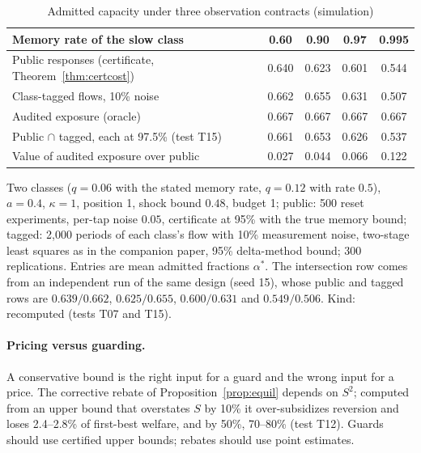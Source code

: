 \documentclass[12pt]{article}
\theoremstyle{definition}
\theoremstyle{remark}
\begin{document}
\begin{table}[t]\centering\small
\begin{threeparttable}
\caption{Admitted capacity under three observation contracts (simulation)}\label{tab:discsim}
\begin{tabular}{lcccc}
\toprule
Memory rate of the slow class & 0.60 & 0.90 & 0.97 & 0.995\\
\midrule
Public responses (certificate, Theorem~\ref{thm:certcost}) & 0.640 & 0.623 & 0.601 & 0.544\\
Class-tagged flows, 10\% noise & 0.662 & 0.655 & 0.631 & 0.507\\
Audited exposure (oracle) & 0.667 & 0.667 & 0.667 & 0.667\\
Public $\cap$ tagged, each at 97.5\% (test T15) & 0.661 & 0.653 & 0.626 & 0.537\\
\midrule
Value of audited exposure over public & 0.027 & 0.044 & 0.066 & 0.122\\
\bottomrule
\end{tabular}
\begin{tablenotes}\footnotesize\item Two classes ($q=0.06$ with the stated memory rate, $q=0.12$ with rate $0.5$), $a=0.4$, $\kappa=1$, position 1, shock bound $0.48$, budget 1; public: 500 reset experiments, per-tap noise $0.05$, certificate at 95\% with the true memory bound; tagged: 2{,}000 periods of each class's flow with 10\% measurement noise, two-stage least squares as in the companion paper, 95\% delta-method bound; 300 replications. Entries are mean admitted fractions $\alpha^*$. The intersection row comes from an independent run of the same design (seed 15), whose public and tagged rows are $0.639/0.662$, $0.625/0.655$, $0.600/0.631$ and $0.549/0.506$. Kind: recomputed (tests T07 and T15).\end{tablenotes}
\end{threeparttable}
\end{table}

\paragraph{Pricing versus guarding.} A conservative bound is the right input for a guard and the wrong input for a price. The corrective rebate of Proposition~\ref{prop:equil} depends on $S^2$; computed from an upper bound that overstates $S$ by 10\% it over-subsidizes reversion and loses 2.4--2.8\% of first-best welfare, and by 50\%, 70--80\% (test T12). Guards should use certified upper bounds; rebates should use point estimates.
\end{document}
